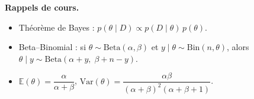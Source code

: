 \documentclass[11pt,a4paper]{article}
\begin{document}
\vspace{3mm}
\begin{donnees}
\small\textbf{Rappels de cours.}
\begin{itemize}[leftmargin=4mm, itemsep=0pt]
  \item Théorème de Bayes : $p(\theta \mid D) \propto p(D \mid \theta)\, p(\theta)$.
  \item Beta--Binomial : si $\theta \sim \mathrm{Beta}(\alpha, \beta)$ et $y \mid \theta \sim \mathrm{Bin}(n, \theta)$, alors $\theta \mid y \sim \mathrm{Beta}(\alpha + y,\; \beta + n - y)$.
  \item $\mathbb{E}(\theta) = \dfrac{\alpha}{\alpha + \beta}$, \qquad $\mathrm{Var}(\theta) = \dfrac{\alpha\beta}{(\alpha+\beta)^2 (\alpha+\beta+1)}$.
\end{itemize}
\end{donnees}
\end{document}
